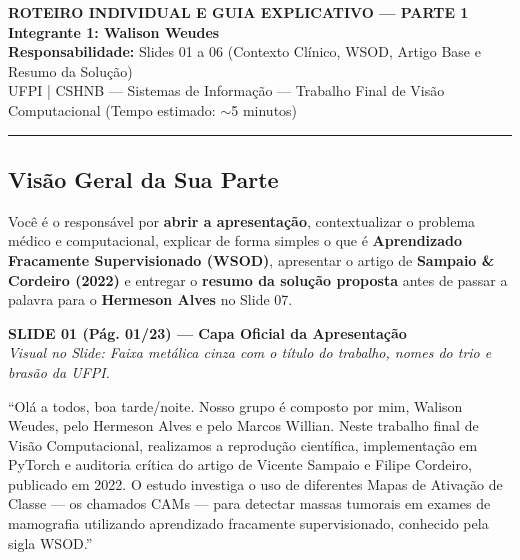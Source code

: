 \documentclass[11pt,a4paper]{article}
\newcommand{\slideheader}[3]{%
    \vspace{10pt}%
    \begin{tcolorbox}[colback=slateborder, colframe=slateborder, coltext=white, boxrule=0pt, arc=3pt, left=8pt, right=8pt, top=5pt, bottom=5pt]
        {\large\bfseries #1 — #2}\\[2pt]
        {\small\itshape Visual no Slide: #3}
    \end{tcolorbox}%
}
\newenvironment{falabox}{%
    \begin{tcolorbox}[colback=speechbg, colframe=speechborder, boxrule=1.2pt, arc=4pt, left=10pt, right=10pt, top=8pt, bottom=8pt, title={\bfseries O QUE VOCÊ DEVE FALAR (Fala Sugerida)}]%
}{%
    \end{tcolorbox}%
}
\begin{document}
\begin{center}
    {\LARGE\bfseries ROTEIRO INDIVIDUAL E GUIA EXPLICATIVO — PARTE 1}\\[6pt]
    {\Large\bfseries Integrante 1: Walison Weudes}\\[4pt]
    {\normalsize\textbf{Responsabilidade:} Slides 01 a 06 (Contexto Clínico, WSOD, Artigo Base e Resumo da Solução)}\\
    {\small UFPI | CSHNB — Sistemas de Informação — Trabalho Final de Visão Computacional (Tempo estimado: $\sim$5 minutos)}
\end{center}
\hrule
\vspace{6pt}

\subsection*{Visão Geral da Sua Parte}
Você é o responsável por \textbf{abrir a apresentação}, contextualizar o problema médico e computacional, explicar de forma simples o que é \textbf{Aprendizado Fracamente Supervisionado (WSOD)}, apresentar o artigo de \textbf{Sampaio \& Cordeiro (2022)} e entregar o \textbf{resumo da solução proposta} antes de passar a palavra para o \textbf{Hermeson Alves} no Slide 07.

\slideheader{SLIDE 01 (Pág. 01/23)}{Capa Oficial da Apresentação}{Faixa metálica cinza com o título do trabalho, nomes do trio e brasão da UFPI.}

\begin{falabox}
``Olá a todos, boa tarde/noite. Nosso grupo é composto por mim, Walison Weudes, pelo Hermeson Alves e pelo Marcos Willian. Neste trabalho final de Visão Computacional, realizamos a reprodução científica, implementação em PyTorch e auditoria crítica do artigo de Vicente Sampaio e Filipe Cordeiro, publicado em 2022. O estudo investiga o uso de diferentes Mapas de Ativação de Classe — os chamados CAMs — para detectar massas tumorais em exames de mamografia utilizando aprendizado fracamente supervisionado, conhecido pela sigla WSOD.''
\end{falabox}
\end{document}
